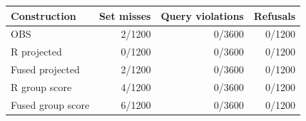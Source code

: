 \begin{tabular}{lrrr}
\toprule
Construction & Set misses & Query violations & Refusals\\
\midrule
OBS & 2/1200 & 0/3600 & 0/1200\\
R projected & 0/1200 & 0/3600 & 0/1200\\
Fused projected & 2/1200 & 0/3600 & 0/1200\\
R group score & 4/1200 & 0/3600 & 0/1200\\
Fused group score & 6/1200 & 0/3600 & 0/1200\\
\bottomrule
\end{tabular}
